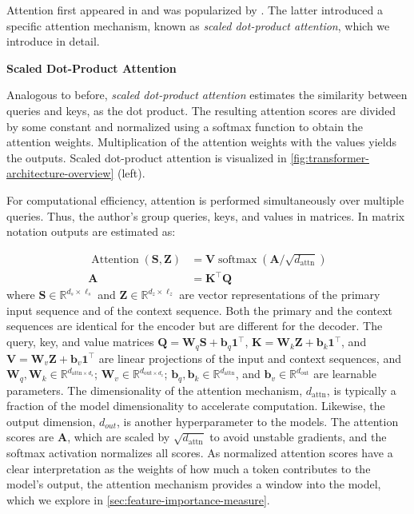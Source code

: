 Attention first appeared in \textcite[][4]{bahdanauNeuralMachineTranslation2016} and was popularized by \textcite[][4]{vaswaniAttentionAllYou2017}. The latter introduced a specific attention mechanism, known as \emph{scaled dot-product attention}, which we introduce in detail.

\textbf{Scaled Dot-Product Attention}

Analogous to before, \emph{scaled dot-product attention} estimates the similarity between queries and keys, as the dot product. The resulting attention scores are divided by some constant and normalized using a softmax function to obtain the attention weights. Multiplication of the attention weights with the values yields the outputs. Scaled dot-product attention is visualized in \cref{fig:transformer-architecture-overview} (left).

For computational efficiency, attention is performed simultaneously over multiple queries. Thus, the author's group queries, keys, and values in matrices. In matrix notation outputs are estimated as:

\begin{equation}
    \begin{aligned}
        \operatorname{Attention}(\mathbf{S},\mathbf{Z}) & = \mathbf{V} \operatorname{softmax}\left(\mathbf{A} / \sqrt{d_{\mathrm{attn}}}\right) \\
        \mathbf{A}                                      & = \mathbf{K}^{\top} \mathbf{Q}
    \end{aligned}
    \label{eq:attention}
\end{equation}
where $\mathbf{S} \in \mathbb{R}^{d_s \times \ell_s}$ and $\mathbf{Z} \in \mathbb{R}^{d_z \times \ell_z}$ are vector representations of the primary input sequence and of the context sequence. Both the primary and the context sequences are identical for the encoder but are different for the decoder. The query, key, and value matrices $\mathbf{Q}=\mathbf{W}_q \mathbf{S} + \mathbf{b}_q\mathbf{1}^{\top}$, $\mathbf{K}=\mathbf{W}_k \mathbf{Z} + \mathbf{b}_k\mathbf{1}^{\top}$, and $\mathbf{V}=\mathbf{W}_v \mathbf{Z} + \mathbf{b}_v\mathbf{1}^{\top}$ are linear projections of the input and context sequences, and $\mathbf{W}_q, \mathbf{W}_k \in \mathbb{R}^{d_{\mathrm{attn}\times d_{s}}}$; $\mathbf{W}_v \in \mathbb{R}^{d_{\mathrm{out}\times d_{z}}}$; $\mathbf{b}_q, \mathbf{b}_k \in \mathbb{R}^{d_{\mathrm{attn}}}$, and $\mathbf{b}_v \in \mathbb{R}^{d_{\mathrm{out}}}$ are learnable parameters. The dimensionality of the attention mechanism, $d_{\mathrm{attn}}$, is typically a fraction of the model dimensionality to accelerate computation. Likewise, the output dimension, $d_{out}$, is another hyperparameter to the models. The attention scores are $\mathbf{A}$, which are scaled by $\sqrt{d_{\mathrm{attn}}}$ to avoid unstable gradients, and the softmax activation normalizes all scores. As normalized attention scores have a clear interpretation as the weights of how much a token contributes to the model's output, the attention mechanism provides a window into the model, which we explore in \cref{sec:feature-importance-measure}.

